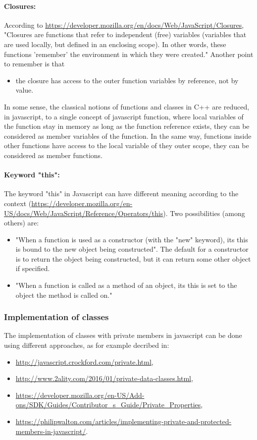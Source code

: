 \paragraph{Closures:}
According to \url{https://developer.mozilla.org/en/docs/Web/JavaScript/Closures},
"Closures are functions that refer to independent (free) variables (variables 
that are used locally, but defined in an enclosing scope). 
In other words, these functions 'remember' the environment in which they were created."
Another point to remember is that
\begin{itemize}
 \item the closure has access to the outer function variables by reference, not by value.
\end{itemize}

In some sense, the classical notions of functions and classes in C++ are reduced,
in javascript, to a single concept of javascript function, where local variables
of the function stay in memory as long as the function reference exists, they 
can be considered as member variables of the function. In the same way, functions inside
other functions have access to the local variable of they outer scope, they 
can be considered as member functions.

 \paragraph{Keyword "this":}
The keyword "this" in Javascript can have different meaning according to the
context
(\url{https://developer.mozilla.org/en-US/docs/Web/JavaScript/Reference/Operators/this}).
Two possibilities (among others) are:
\begin{itemize}
  \item "When a function is used as a constructor (with the "new" keyword), its this is bound 
to the new object being constructed". The default for a constructor is to return
the object being constructed, but it can return some other object if specified.
  \item "When a function is called as a method of an object, its this is set to 
        the object the method is called on."
\end{itemize}


\subsubsection{Implementation of classes}

The implementation of classes with private members in javascript can be
done using different approaches, as for example decribed in:
\begin{itemize}
 \item \url{http://javascript.crockford.com/private.html}, 
 \item \url{http://www.2ality.com/2016/01/private-data-classes.html},
 \item \url{https://developer.mozilla.org/en-US/Add-ons/SDK/Guides/Contributor_s_Guide/Private_Properties},
 \item \url{https://philipwalton.com/articles/implementing-private-and-protected-members-in-javascript/}.
\end{itemize}

